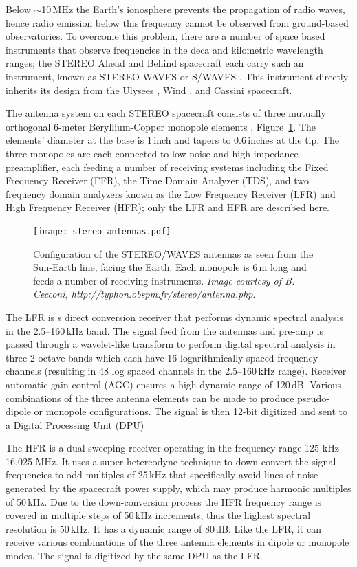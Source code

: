 Below $\sim$10\,MHz the Earth's ionosphere prevents the propagation of radio waves, hence radio emission below this frequency cannot be observed from ground-based observatories. To overcome this problem, there are a number of space based instruments that observe frequencies in the deca and kilometric wavelength ranges; the STEREO Ahead and Behind spacecraft each carry such an instrument, known as STEREO WAVES or S/WAVES \citep{bougeret2008}. This instrument directly inherits its design from the Ulysees \citep{stone1992}, Wind \citep{bougeret1995}, and Cassini \citep{gurnett2004} spacecraft.

The antenna system on each STEREO spacecraft consists of three mutually orthogonal 6-meter Beryllium-Copper monopole elements \citep{bale2008}, Figure~\ref{fig:swaves_antennas}. The elements' diameter at the base is 1\,inch and tapers to 0.6\,inches at the tip. The three monopoles are each connected to low noise and high impedance preamplifier, each feeding a number of receiving systems including the Fixed Frequency Receiver (FFR), the Time Domain Analyzer (TDS), and two frequency domain analyzers known as the Low Frequency Receiver (LFR) and High Frequency Receiver (HFR); only the LFR and HFR are described here.
\begin{figure}[!t]
\begin{center}
\texttt{[image: stereo\_antennas.pdf]}
\caption[The SWAVES antennas]{Configuration of the STEREO/WAVES antennas as seen from the Sun-Earth line, facing the Earth. Each monopole is 6\,m long and feeds a number of receiving instruments. \emph{Image courtesy of B. Cecconi, http://typhon.obspm.fr/stereo/antenna.php}.}
\label{fig:swaves_antennas}
\end{center}
\end{figure}

The LFR is s direct conversion receiver that performs dynamic spectral analysis in the 2.5--160\,kHz band. The signal feed from the antennas and pre-amp is passed through a wavelet-like transform to perform digital spectral analysis in three 2-octave bands which each have 16 logarithmically spaced frequency channels (resulting in 48 log spaced channels in the 2.5--160\,kHz range). Receiver automatic gain control (AGC) ensures a high dynamic range of 120\,dB. Various combinations of the three antenna elements can be made to produce pseudo-dipole or monopole configurations. The signal is then 12-bit digitized and sent to a Digital Processing Unit (DPU)

The HFR is a dual sweeping receiver operating in the frequency range 125 kHz--16.025 MHz. It uses a super-hetereodyne technique to down-convert the signal frequencies to odd multiples of 25\,kHz that specifically avoid lines of noise generated by the spacecraft power supply, which may produce harmonic multiples of 50\,kHz. Due to the down-conversion process the HFR frequency range is covered in multiple steps of 50\,kHz increments, thus the highest spectral resolution is 50\,kHz. It has a dynamic range of 80\,dB. Like the LFR, it can receive various combinations of the three antenna elements in dipole or monopole modes. The signal is digitized by the same DPU as the LFR.


